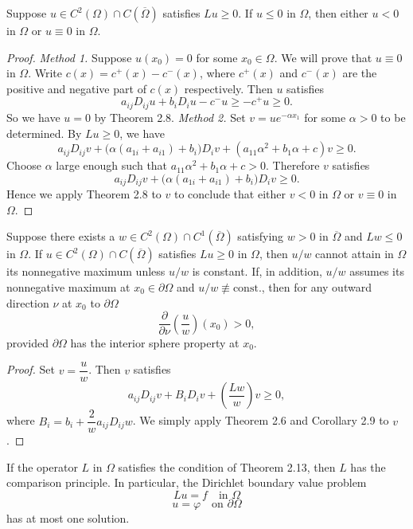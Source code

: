 \begin{theorem}\label{hanlin:maxprin-theorem-2-12}
Suppose $u \in C^2(\Omega)\cap C(\overline{\Omega})$ satisfies $Lu \ge 0$. If $u \le 0$ in $\Omega$,
then either $u < 0$ in $\Omega$ or $u \equiv 0$ in $\Omega$.
\end{theorem}
\begin{proof}
\sketch
\emph{Method 1.} Suppose $u(x_0)=0$ for some $x_0\in\Omega$. We will prove that
$u\equiv 0$ in $\Omega$. Write $c(x)=c^+(x)-c^-(x)$, where $c^+(x)$ and $c^-(x)$ are the positive
and negative part of $c(x)$ respectively. Then $u$ satisfies
\[
a_{ij}D_{ij}u+b_iD_iu-c^-u\ge -c^+u\ge 0.
\]
So we have $u=0$ by Theorem 2.8.
\emph{Method 2.} Set $v=ue^{-\alpha x_1}$ for some $\alpha>0$ to be determined. By $Lu\ge 0$, we
have
\[
a_{ij}D_{ij}v+\bigl(\alpha(a_{1i}+a_{i1})+b_i\bigr)D_iv+(a_{11}\alpha^2+b_1\alpha+c)v\ge 0.
\]
Choose $\alpha$ large enough such that $a_{11}\alpha^2+b_1\alpha+c>0$. Therefore $v$ satisfies
\[
a_{ij}D_{ij}v+\bigl(\alpha(a_{1i}+a_{i1})+b_i\bigr)D_iv\ge 0.
\]
Hence we apply Theorem 2.8 to $v$ to conclude that either $v<0$ in $\Omega$ or $v\equiv 0$ in
$\Omega$.
\end{proof}

\begin{theorem}\label{hanlin:maxprin-theorem-2-13}
Suppose there exists a $w\in C^2(\Omega)\cap C^1(\overline{\Omega})$ satisfying $w>0$ in
$\overline{\Omega}$ and $Lw\le 0$ in $\Omega$. If $u\in C^2(\Omega)\cap C(\overline{\Omega})$ satisfies $Lu\ge 0$ in $\Omega$, then
$u/w$ cannot attain in $\Omega$ its nonnegative maximum unless $u/w$ is constant. If, in addition, $u/w$
assumes its nonnegative maximum at $x_0\in\partial\Omega$ and $u/w\not\equiv \mathrm{const}.$, then for any
outward direction $\nu$ at $x_0$ to $\partial\Omega$
\[
\frac{\partial}{\partial\nu}\left(\frac{u}{w}\right)(x_0)>0,
\]
provided $\partial\Omega$ has the interior sphere property at $x_0$.
\end{theorem}
\begin{proof}
\sketch
Set $v=\dfrac{u}{w}$. Then $v$ satisfies
\[
a_{ij}D_{ij}v+B_iD_iv+\left(\frac{Lw}{w}\right)v\ge 0,
\]
where $B_i=b_i+\dfrac{2}{w}a_{ij}D_{ij}w$. We simply apply Theorem 2.6 and Corollary 2.9 to
$v$.
\end{proof}

\begin{remark}\label{hanlin:maxprin-remark-2-14}
If the operator $L$ in $\Omega$ satisfies the condition of Theorem 2.13,
then $L$ has the comparison principle. In particular, the Dirichlet boundary value
problem
\[
Lu=f \quad \text{in }\Omega
\]
\[
u=\varphi \quad \text{on }\partial\Omega
\]
has at most one solution.
\end{remark}

